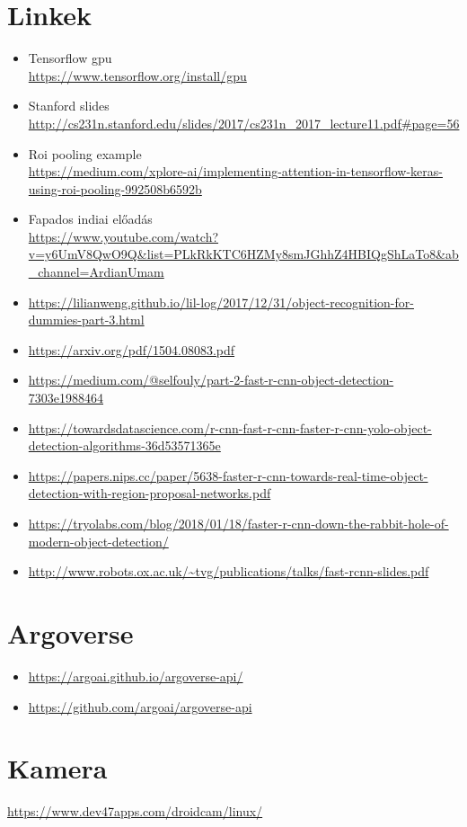 \documentclass[12pt]{report}
\begin{document}
\chapter{Linkek}
\begin{itemize}
\item Tensorflow gpu \\\url{https://www.tensorflow.org/install/gpu}
\item Stanford slides \\\url{http://cs231n.stanford.edu/slides/2017/cs231n_2017_lecture11.pdf#page=56}
\item Roi pooling example \\\url{https://medium.com/xplore-ai/implementing-attention-in-tensorflow-keras-using-roi-pooling-992508b6592b}
\item Fapados indiai előadás \\\url{https://www.youtube.com/watch?v=y6UmV8QwO9Q&list=PLkRkKTC6HZMy8smJGhhZ4HBIQgShLaTo8&ab_channel=ArdianUmam}
\item \url{https://lilianweng.github.io/lil-log/2017/12/31/object-recognition-for-dummies-part-3.html}
\item \url{https://arxiv.org/pdf/1504.08083.pdf}
\item \url{https://medium.com/@selfouly/part-2-fast-r-cnn-object-detection-7303e1988464}
\item \url{https://towardsdatascience.com/r-cnn-fast-r-cnn-faster-r-cnn-yolo-object-detection-algorithms-36d53571365e}
\item \url{https://papers.nips.cc/paper/5638-faster-r-cnn-towards-real-time-object-detection-with-region-proposal-networks.pdf}
\item \url{https://tryolabs.com/blog/2018/01/18/faster-r-cnn-down-the-rabbit-hole-of-modern-object-detection/}
\item \url{http://www.robots.ox.ac.uk/~tvg/publications/talks/fast-rcnn-slides.pdf}
\end{itemize}

\chapter{Argoverse}
\begin{itemize}
	\item \url{https://argoai.github.io/argoverse-api/}
	\item \url{https://github.com/argoai/argoverse-api}
\end{itemize}


\chapter{Kamera}
\url{https://www.dev47apps.com/droidcam/linux/}
\end{document}
